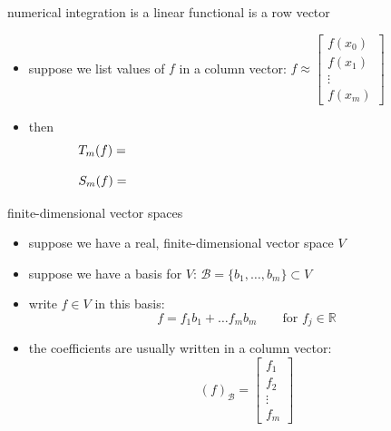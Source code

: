 \documentclass[10pt,
               svgnames,
               hyperref={colorlinks,citecolor=DeepPink4,linkcolor=FireBrick,urlcolor=Maroon},
               usepdftitle=false]{beamer}
\newcommand{\RR}{\mathbb{R}}
\newcommand{\ds}{\displaystyle}
\begin{document}
\begin{frame}{numerical integration is a linear functional is a row vector}

\begin{itemize}
\item suppose we list values of $f$ in a column vector: \qquad $\ds f \approx \begin{bmatrix} f(x_0) \\ f(x_1) \\ \vdots \\ f(x_m) \end{bmatrix}$
\item then
	$$T_m(f) = \hspace{80mm}$$

\vspace{20mm}
	$$S_m(f) = \hspace{80mm}$$

\vspace{30mm}
\end{itemize}
\end{frame}


\begin{frame}{finite-dimensional vector spaces}

\begin{itemize}
\item suppose we have a real, finite-dimensional vector space $V$
\item suppose we have a basis for $V$: \quad $\mathcal{B} = \{b_1,\dots,b_m\} \subset V$
\item write $f\in V$ in this basis:
	$$f = f_1 b_1 + \dots f_m b_m \qquad \text{for } f_j\in \RR$$
\item the coefficients are usually written in a column vector:
  $$(f)_{\mathcal{B}} = \begin{bmatrix} f_1 \\ f_2 \\ \vdots \\ f_m \end{bmatrix}$$
\end{itemize}
\end{frame}
\end{document}
